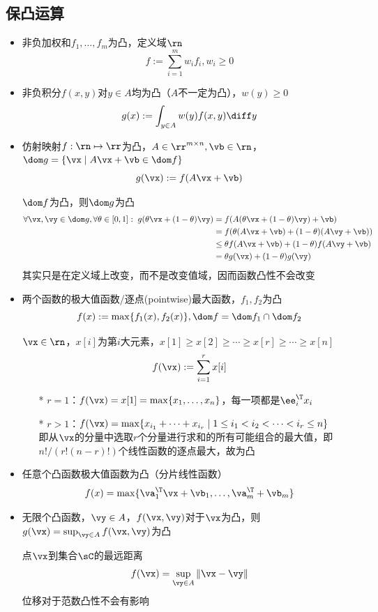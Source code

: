 \subsection{保凸运算}
\begin{itemize}
	\item 非负加权和$f_1,\ldots,f_m$为凸，定义域$\rn$
	\[f:=\sum_{i=1}^m w_if_i,w_i\geq 0\]
	\item 非负积分$f(x,y)$对$y\in A$均为凸（$A$不一定为凸），$w(y)\geq 0$
	\[g(x):=\int_{y\in A}w(y)f(x,y)\diff y\]
	\item 仿射映射$f:\rn\mapsto\rr$为凸，$A\in\rr^{m\times n},\vb\in\rn$，$\dom g=\{\vx\mid A\vx+\vb\in\dom f\}$
	\[g(\vx):=f(A\vx+\vb)\]
	\begin{analysis}
		$\dom f$为凸，则$\dom g$为凸
		\[\begin{aligned}
			\forall \vx,\vy\in\dom g,\forall\theta\in[0,1]:\;
		g(\theta \vx+(1-\theta)\vy)&=f(A(\theta \vx+(1-\theta)\vy)+\vb)\\
		&=f(\theta(A\vx+\vb)+(1-\theta)(A\vy+\vb))\\
		&\leq\theta f(A\vx+\vb)+(1-\theta)f(A\vy+\vb)\\
		&=\theta g(\vx)+(1-\theta)g(\vy)
		\end{aligned}\]
		其实只是在定义域上改变，而不是改变值域，因而函数凸性不会改变
	\end{analysis}

	\item 两个函数的极大值函数/逐点(pointwise)最大函数，$f_1,f_2$为凸
	\[f(x):=\max\{f_1(x),f_2(x)\},\dom f=\dom f_1\cap\dom f_2\]
	\begin{example}
	$\vx\in\rn$，$x[i]$为第$i$大元素，$x[1]\geq x[2]\geq\cdots\geq x[r]\geq\cdots\geq x[n]$
	\[f(\vx):=\sum_{i=1}^r x[i]\]
	\begin{itemize}
	\item[*] $r=1$：$f(\vx)=x[1]=\max\{x_1,\ldots,x_n\}$，每一项都是$\ee_i^\T x_i$
	\item[*] $r>1$：$f(\vx)=\max\{x_{i_1}+\cdots+x_{i_r}\mid 1\leq i_1<i_2<\cdots<i_r\leq n\}$\\
	即从$\vx$的分量中选取$r$个分量进行求和的所有可能组合的最大值，即$n!/(r!(n-r)!)$个线性函数的逐点最大，故为凸
	\end{itemize}
	\end{example}
	\item 任意个凸函数极大值函数为凸（分片线性函数）
	\[f(x)=\max\{\va_1^\T \vx+\vb_1,\ldots,\va_m^\T+\vb_m\}\]
	\item 无限个凸函数，$\vy\in A$，$f(\vx,\vy)$对于$\vx$为凸，则$g(\vx)=\sup_{\vy\in A} f(\vx,\vy)$为凸
	\begin{example}
	点$\vx$到集合$\sC$的最远距离
	\[f(\vx)=\sup_{\vy\in A}\|\vx-\vy\|\]
	位移对于范数凸性不会有影响
	\end{example}


\end{itemize}

